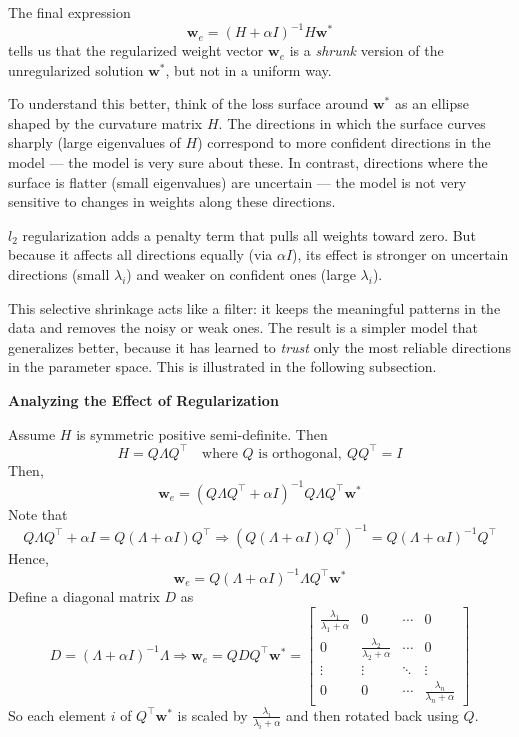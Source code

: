 The final expression
\[
\mathbf{w}_e = (H + \alpha I)^{-1} H \mathbf{w}^*
\]
tells us that the regularized weight vector \( \mathbf{w}_e \) is a \textit{shrunk} version of the unregularized solution \( \mathbf{w}^* \), but not in a uniform way.

To understand this better, think of the loss surface around \( \mathbf{w}^* \) as an ellipse shaped by the curvature matrix \( H \). The directions in which the surface curves sharply (large eigenvalues of \( H \)) correspond to more confident directions in the model — the model is very sure about these. In contrast, directions where the surface is flatter (small eigenvalues) are uncertain — the model is not very sensitive to changes in weights along these directions.

$l_2$ regularization adds a penalty term that pulls all weights toward zero. But because it affects all directions equally (via \( \alpha I \)), its effect is stronger on uncertain directions (small \( \lambda_i \)) and weaker on confident ones (large \( \lambda_i \)).

This selective shrinkage acts like a filter: it keeps the meaningful patterns in the data and removes the noisy or weak ones. The result is a simpler model that generalizes better, because it has learned to \textit{trust} only the most reliable directions in the parameter space. This is illustrated in the following subsection. 

\vspace{1em}
\textbf{Analyzing the Effect of Regularization}

Assume \( H \) is symmetric positive semi-definite. Then 
\[
H = Q \Lambda Q^\top
\quad \text{where } Q \text{ is orthogonal},\ QQ^\top = I
\]
Then,
\[
\mathbf{w}_e = (Q\Lambda Q^\top + \alpha I)^{-1} Q \Lambda Q^\top \mathbf{w}^*
\]
Note that
\[
Q \Lambda Q^\top + \alpha I = Q (\Lambda + \alpha I) Q^\top
\Rightarrow (Q (\Lambda + \alpha I) Q^\top)^{-1} = Q (\Lambda + \alpha I)^{-1} Q^\top
\]
Hence,
\[
\mathbf{w}_e = Q (\Lambda + \alpha I)^{-1} \Lambda Q^\top \mathbf{w}^*
\]
Define a diagonal matrix \( D \) as
\[
D = (\Lambda + \alpha I)^{-1} \Lambda
\Rightarrow \mathbf{w}_e = Q D Q^\top \mathbf{w}^* =
\begin{bmatrix}
\frac{\lambda_1}{\lambda_1 + \alpha} & 0 & \cdots & 0 \\
0 & \frac{\lambda_2}{\lambda_2 + \alpha} & \cdots & 0 \\
\vdots & \vdots & \ddots & \vdots \\
0 & 0 & \cdots & \frac{\lambda_n}{\lambda_n + \alpha}
\end{bmatrix}
\]
So each element \( i \) of \( Q^\top \mathbf{w}^* \) is scaled by
\(
\frac{\lambda_i}{\lambda_i + \alpha}
\)
and then rotated back using \( Q \). 

